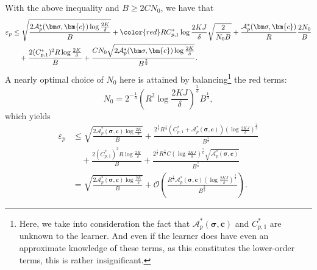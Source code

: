 \documentclass{article}
\def\vc{{\bm{c}}}
\def\gA{{\mathcal{A}}}
\def\gO{{\mathcal{O}}}
\theoremstyle{plain}
\theoremstyle{definition}
\theoremstyle{plain}
\begin{document}
With the above inequality and $B \geq 2 C N_0$, we have that
\begin{align}
    \varepsilon_p &\leq \sqrt{\frac{2 \gA_p^*(\bm\sigma, \vc) \log\frac{2K}{\delta}}{B}} + {\color{red} R C_{p,1}^* \log\frac{2 K J}{\delta} \sqrt{\frac{2}{N_0 B}} + \frac{\gA_p^*(\bm\sigma, \vc)}{R} \frac{2 N_0}{B}} \\
    &\quad + \frac{2 (C_{p,1}^*)^2 R \log\frac{2K}{\delta}}{B} + \frac{C N_0 \sqrt{2 \gA_p^*(\bm\sigma, \vc) \log\frac{2K}{\delta}}}{B^{\frac{3}{2}}}.
\end{align}
A nearly optimal choice of $N_0$ here is attained by balancing\footnote{Here, we take into consideration the fact that $\gA_p^*(\bm\sigma, \vc)$ and $C_{p,1}^*$ are unknown to the learner. And even if the learner does have even an approximate knowledge of these terms, as this constitutes the lower-order terms, this is rather insignificant.} the {\color{red}red} terms:
\begin{equation}
    N_0 = 2^{-\frac{1}{3}} \left( R^2 \log\frac{2 K J}{\delta} \right)^{\frac{2}{3}} B^{\frac{1}{3}},
\end{equation}
which yields
\begin{align}
    \varepsilon_p &\leq \sqrt{\frac{2 \gA_p^*(\bm\sigma, \vc) \log\frac{2K}{\delta}}{B}} + \frac{2^{\frac{2}{3}} R^{\frac{1}{3}} \left( C_{p,1}^* + \gA_p^*(\bm\sigma, \vc) \right) \left( \log\frac{2 K J}{\delta} \right)^{\frac{2}{3}}}{B^{\frac{2}{3}}} \\
    &\quad + \frac{2 (C_{p,1}^*)^2 R \log\frac{2K}{\delta}}{B} + \frac{2^{\frac{1}{6}} R^{\frac{4}{3}} C \left( \log\frac{2 K J}{\delta} \right)^{\frac{7}{6}} \sqrt{\gA_p^*( \bm\sigma, \vc)}}{B^{\frac{7}{6}}}\\
    & = \sqrt{\frac{2 \gA_p^*(\bm\sigma, \vc) \log\frac{2K}{\delta}}{B}} + \gO \left( \frac{R^{\frac{1}{3}}\gA_p^*(\bm\sigma, \vc) \left(\log \frac{2KJ}{\delta}\right)^{\frac{2}{3}}}{B^{\frac{2}{3}}}\right).
\end{align}
\end{document}
